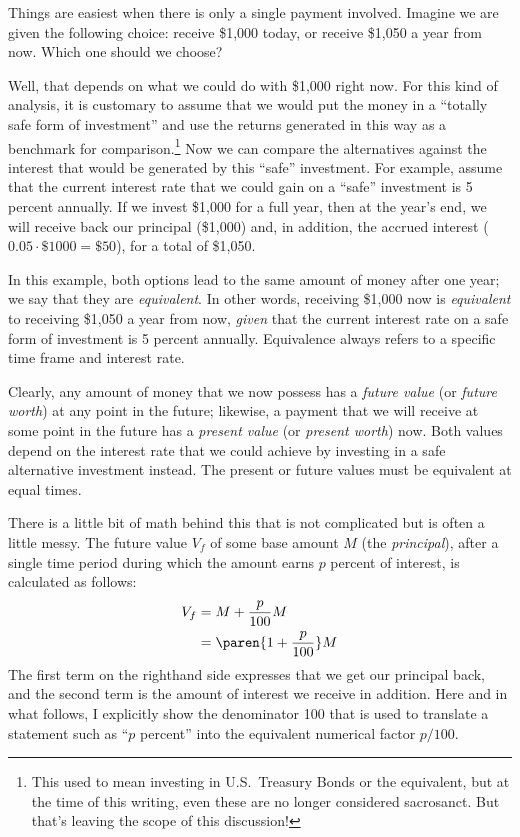   
Things are easiest when there is only a single payment involved.
Imagine we are given the following choice: receive \$1,000 today, or
receive \$1,050 a year from now. Which one should we choose?
    
Well, that depends on what we could do with \$1,000 right now.  For
this kind of analysis, it is customary to assume that we\vadjust{\pagebreak} would put
the money in a ``totally safe form of investment'' and use the returns
generated\vadjust{} in this way as a benchmark for comparison.\footnote{This
  used to mean investing in U.S.\ Treasury Bonds or the equivalent,
  but at the time of this writing, even these are no longer considered
  sacrosanct. But that's leaving the scope of this discussion!} Now we
can compare the alternatives against the interest that would be
generated by this ``safe'' investment. For example, assume that the
current interest rate that we could gain on a ``safe'' investment is 5
percent annually. If we invest \$1,000 for a full year, then at the
year's end, we will receive back our principal (\$1,000) and, in
addition, the accrued interest ($0.05 \cdot \$1000 = \$50$), for a
total of \$1,050.
    
In this example, both options lead to the same amount of money after
one year; we say that they are \emph{equivalent}. In other words,
receiving \$1,000 now is \emph{equivalent} to receiving \$1,050 a year
from now, \emph{given} that the current interest rate on a safe form
of investment is 5 percent annually. Equivalence always refers to a
specific time frame and interest rate.
    
Clearly, any amount of money that we now possess has a \emph{future
  value} (or \emph{future worth}) at any point in the future;
likewise, a payment that we will receive at some point in the future
has a \emph{present value} (or \emph{present worth}) now.  Both values
depend on the interest rate that we could achieve by investing in a
safe alternative investment instead. The present or future values must
be equivalent at equal times.

    
There is a little bit of math behind this that is not complicated but
is often a little messy. The future value $V_f$ of some base amount
$M$ (the \emph{principal}), after a single time period during which
the amount earns $p$ percent of interest, is calculated as follows:
%
\begin{align*}
V_f & = M + \frac{p}{100} M \\
    & = \paren{ 1 + \frac{p}{100} } M
\end{align*}
%
The first term on the righthand side expresses that we get our
principal back, and the second term is the amount of interest we
receive in addition. Here and in what follows, I explicitly show
the denominator 100 that is used to translate a statement such as
``$p$ percent'' into the equivalent numerical factor $p/100$.
    

